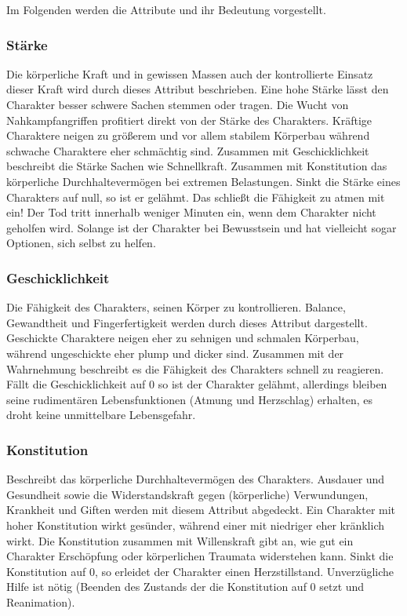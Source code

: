 \documentclass{article}
\begin{document}
Im Folgenden werden die Attribute und ihr Bedeutung vorgestellt. 

\subsubsection{Stärke}

Die körperliche Kraft und in gewissen Massen auch der kontrollierte Einsatz dieser Kraft wird durch dieses Attribut
beschrieben. Eine hohe Stärke lässt den Charakter besser schwere Sachen stemmen oder tragen. Die Wucht von
Nahkampfangriffen profitiert direkt von der Stärke des Charakters. Kräftige Charaktere neigen zu größerem und vor
allem stabilem Körperbau während schwache Charaktere eher schmächtig sind. Zusammen mit Geschicklichkeit beschreibt
die Stärke Sachen wie Schnellkraft. Zusammen mit Konstitution das körperliche Durchhaltevermögen bei extremen
Belastungen. Sinkt die Stärke eines Charakters auf null, so ist er gelähmt. Das schließt die Fähigkeit zu atmen mit
ein! Der Tod tritt innerhalb weniger Minuten ein, wenn dem Charakter nicht geholfen wird. Solange ist der Charakter
bei Bewusstsein und hat vielleicht sogar Optionen, sich selbst zu helfen.

\subsubsection{Geschicklichkeit}

Die Fähigkeit des Charakters, seinen Körper zu kontrollieren. Balance, Gewandtheit und Fingerfertigkeit werden
durch dieses Attribut dargestellt. Geschickte Charaktere neigen eher zu sehnigen und schmalen Körperbau, während
ungeschickte eher plump und dicker sind. Zusammen mit der Wahrnehmung beschreibt es die Fähigkeit des Charakters
schnell zu reagieren. Fällt die Geschicklichkeit auf 0 so ist der Charakter gelähmt, allerdings bleiben seine
rudimentären Lebensfunktionen (Atmung und Herzschlag) erhalten, es droht keine unmittelbare Lebensgefahr.

\subsubsection{Konstitution}

Beschreibt das körperliche Durchhaltevermögen des Charakters. Ausdauer und Gesundheit sowie die Widerstandskraft gegen
(körperliche) Verwundungen, Krankheit und Giften werden mit diesem Attribut abgedeckt. Ein Charakter mit hoher
Konstitution wirkt gesünder, während einer mit niedriger eher kränklich wirkt. Die Konstitution zusammen mit
Willenskraft gibt an, wie gut ein Charakter Erschöpfung oder körperlichen Traumata widerstehen kann. Sinkt die
Konstitution auf 0, so erleidet der Charakter einen Herzstillstand. Unverzügliche Hilfe ist nötig (Beenden des Zustands
der die Konstitution auf 0 setzt und Reanimation).
\end{document}
